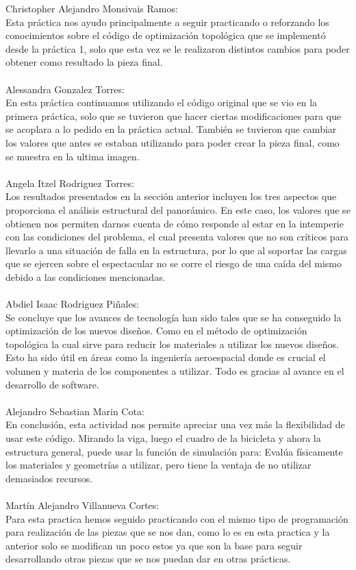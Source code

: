 \documentclass{article}
\begin{document}
Christopher Alejandro Monsivais Ramos: 
\\Esta práctica nos ayudo principalmente a seguir practicando o reforzando los conocimientos sobre el código de optimización topológica que se implementó desde la práctica 1, solo que esta vez se le realizaron distintos cambios para poder obtener como resultado la pieza final.
\\
\\
Alessandra Gonzalez Torres: 
\\En esta práctica continuamos utilizando el código original que se vio en la primera práctica, solo que se tuvieron que hacer ciertas modificaciones para que se acoplara a lo pedido en la práctica actual. También se tuvieron que cambiar los valores que antes se estaban utilizando para poder crear la pieza final, como se muestra en la ultima imagen.
\\
\\
Angela Itzel Rodriguez Torres: 
\\Los resultados presentados en la sección anterior incluyen los tres aspectos que proporciona el análisis estructural del panorámico. En este caso, los valores que se obtienen nos permiten darnos cuenta de cómo responde al estar en la intemperie con las condiciones del problema, el cual presenta valores que no son críticos para llevarlo a una situación de falla en la estructura, por lo que al soportar las cargas que se ejercen sobre el espectacular no se corre el riesgo de una caída del mismo debido a las condiciones mencionadas.
\\
\\
Abdiel Isaac Rodriguez Piñales: 
\\Se concluye que los avances de tecnología han sido tales que se ha conseguido la optimización de los nuevos diseños. Como en el método de optimización topológica la cual sirve para reducir los materiales a utilizar los nuevos diseños. Esto ha sido útil en áreas como la ingeniería aeroespacial donde es crucial el volumen y materia de los componentes a utilizar. Todo es gracias al avance en el desarrollo de software.
\\
\\
Alejandro Sebastian Marin Cota: 
\\En conclusión, esta actividad nos permite apreciar una vez más la flexibilidad de usar este código. Mirando la viga, luego el cuadro de la bicicleta y ahora la estructura general, puede usar la función de simulación para: Evalúa físicamente los materiales y geometrías a utilizar, pero tiene la ventaja de no utilizar demasiados recursos.
\\
\\
Mart\'{i}n Alejandro Villanueva Cortes:
\\Para esta practica hemos seguido practicando con el mismo tipo de programación para realización de las piezas que se nos dan, como lo es en esta practica y la anterior solo se modifican un poco estos ya que son la base para seguir desarrollando otras piezas que se nos puedan dar en otras prácticas.



\end{document}
